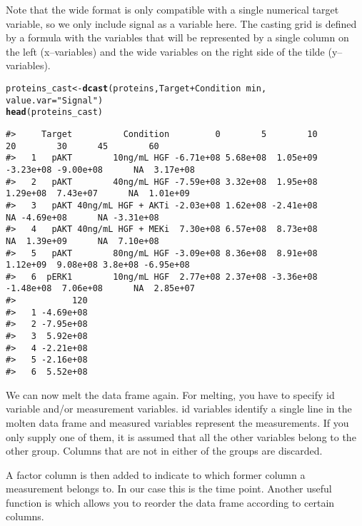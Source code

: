 \documentclass{article}\usepackage[]{graphicx}\usepackage[usenames,dvipsnames]{color}
\makeatletter
\newcommand{\hlstr}[1]{\textcolor[rgb]{0.192,0.494,0.8}{#1}}%
\newcommand{\hlopt}[1]{\textcolor[rgb]{0,0,0}{#1}}%
\newcommand{\hlstd}[1]{\textcolor[rgb]{0.345,0.345,0.345}{#1}}%
\newcommand{\hlkwb}[1]{\textcolor[rgb]{0.69,0.353,0.396}{#1}}%
\newcommand{\hlkwc}[1]{\textcolor[rgb]{0.333,0.667,0.333}{#1}}%
\newcommand{\hlkwd}[1]{\textcolor[rgb]{0.737,0.353,0.396}{\textbf{#1}}}%
\newenvironment{kframe}{%
 \def\at@end@of@kframe{}%
 \ifinner\ifhmode%
  \def\at@end@of@kframe{\end{minipage}}%
  \begin{minipage}{\columnwidth}%
 \fi\fi%
 \def\FrameCommand##1{\hskip\@totalleftmargin \hskip-\fboxsep
 \colorbox{shadecolor}{##1}\hskip-\fboxsep
     \hskip-\linewidth \hskip-\@totalleftmargin \hskip\columnwidth}%
 \MakeFramed {\advance\hsize-\width
   \@totalleftmargin\z@ \linewidth\hsize
   \@setminipage}}%
 {\par\unskip\endMakeFramed%
 \at@end@of@kframe}
\newenvironment{knitrout}{}{} %
\makeatother
\begin{document}
Note that the wide format is only compatible with a single numerical target
variable, so we only include signal as a variable here. The
casting grid is defined by a formula with the variables that will
be represented by a single column on the left (x--variables) and 
the wide variables on the right side of the tilde (y--variables). 

\begin{knitrout}
\color{fgcolor}\begin{kframe}
\begin{alltt}
\hlstd{proteins_cast} \hlkwb{<-} \hlkwd{dcast}\hlstd{(proteins, Target} \hlopt{+} \hlstd{Condition} \hlopt{~}   \hlstd{min ,}
                \hlkwc{value.var} \hlstd{=} \hlstr{"Signal"}\hlstd{)}
\hlkwd{head}\hlstd{(proteins_cast)}
\end{alltt}
\begin{verbatim}
#>     Target          Condition         0        5        10        20        30      45        60
#>   1   pAKT        10ng/mL HGF -6.71e+08 5.68e+08  1.05e+09 -3.23e+08 -9.00e+08      NA  3.17e+08
#>   2   pAKT        40ng/mL HGF -7.59e+08 3.32e+08  1.95e+08  1.29e+08  7.43e+07      NA  1.01e+09
#>   3   pAKT 40ng/mL HGF + AKTi -2.03e+08 1.62e+08 -2.41e+08        NA -4.69e+08      NA -3.31e+08
#>   4   pAKT 40ng/mL HGF + MEKi  7.30e+08 6.57e+08  8.73e+08        NA  1.39e+09      NA  7.10e+08
#>   5   pAKT        80ng/mL HGF -3.09e+08 8.36e+08  8.91e+08  1.12e+09  9.08e+08 3.8e+08 -6.95e+08
#>   6  pERK1        10ng/mL HGF  2.77e+08 2.37e+08 -3.36e+08 -1.48e+08  7.06e+08      NA  2.85e+07
#>           120
#>   1 -4.69e+08
#>   2 -7.95e+08
#>   3  5.92e+08
#>   4 -2.21e+08
#>   5 -2.16e+08
#>   6  5.52e+08
\end{verbatim}
\end{kframe}
\end{knitrout}

We can now melt the data frame again. For melting, you have to specify
id variable and/or measurement variables. id variables identify a single 
line in the molten data frame and measured variables represent the 
measurements. If you only supply one of them, it is assumed that
all the other variables belong to the other group. Columns
that are not in either of the groups are discarded.

A factor column is then added to indicate to which
former column a measurement belongs to. In our case this is the
time point. Another useful function is 
which allows you to reorder the data frame according
to certain columns.  
\end{document}
